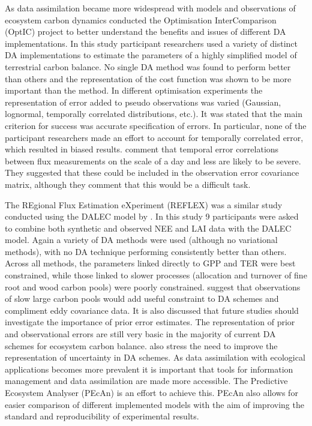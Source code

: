 As data assimilation became more widespread with models and observations of ecosystem carbon dynamics \citet{trudinger2007optic} conducted the Optimisation InterComparison (OptIC) project to better understand the benefits and issues of different DA implementations. In this study participant researchers used a variety of distinct DA implementations to estimate the parameters of a highly simplified model of terrestrial carbon balance. No single DA method was found to perform better than others and the representation of the cost function was shown to be more important than the method. In different optimisation experiments the representation of error added to pseudo observations was varied (Gaussian, lognormal, temporally correlated distributions, etc.). It was stated that the main criterion for success was accurate specification of errors. In particular, none of the participant researchers made an effort to account for temporally correlated error, which resulted in biased results. \citet{williams2009improving} comment that temporal error correlations between flux measurements on the scale of a day and less are likely to be severe. They suggested that these could be included in the observation error covariance matrix, although they comment that this would be a difficult task. 

The REgional Flux Estimation eXperiment (REFLEX) was a similar study conducted using the DALEC model by \citet{fox2009reflex}. In this study 9 participants were asked to combine both synthetic and observed NEE and LAI data with the DALEC model. Again a variety of DA methods were used (although no variational methods), with no DA technique performing consistently better than others. Across all methods, the parameters linked directly to GPP and TER were best constrained, while those linked to slower processes (allocation and turnover of fine root and wood carbon pools) were poorly constrained. \citet{fox2009reflex} suggest that observations of slow large carbon pools would add useful constraint to DA schemes and compliment eddy covariance data. It is also discussed that future studies should investigate the importance of prior error estimates. The representation of prior and observational errors are still very basic in the majority of current DA schemes for ecosystem carbon balance. \citep{Dietze2013} also stress the need to improve the representation of uncertainty in DA schemes. As data assimilation with ecological applications becomes more prevalent it is important that tools for information management and data assimilation are made more accessible. The Predictive Ecosystem Analyser (PEcAn) is an effort to achieve this. PEcAn also allows for easier comparison of different implemented models \citep{Dietze2013} with the aim of improving the standard and reproducibility of experimental results.

